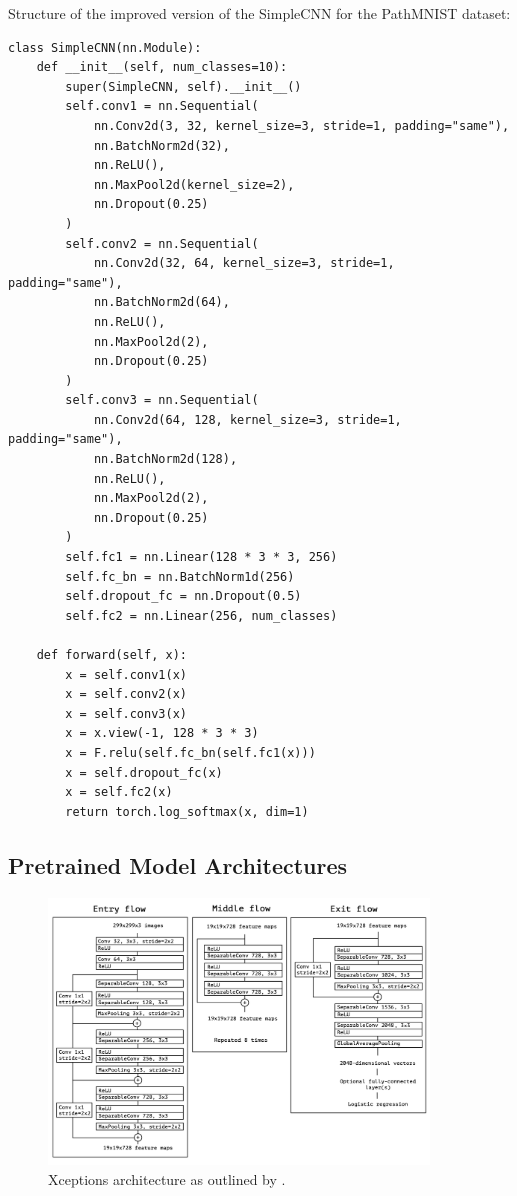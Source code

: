 Structure of the improved version of the SimpleCNN for the PathMNIST dataset:\@

\begin{verbatim}
class SimpleCNN(nn.Module):
    def __init__(self, num_classes=10):
        super(SimpleCNN, self).__init__()
        self.conv1 = nn.Sequential(
            nn.Conv2d(3, 32, kernel_size=3, stride=1, padding="same"),
            nn.BatchNorm2d(32),
            nn.ReLU(),
            nn.MaxPool2d(kernel_size=2),
            nn.Dropout(0.25)
        )
        self.conv2 = nn.Sequential(
            nn.Conv2d(32, 64, kernel_size=3, stride=1, padding="same"),
            nn.BatchNorm2d(64),
            nn.ReLU(),
            nn.MaxPool2d(2),
            nn.Dropout(0.25)
        )
        self.conv3 = nn.Sequential(
            nn.Conv2d(64, 128, kernel_size=3, stride=1, padding="same"),
            nn.BatchNorm2d(128),
            nn.ReLU(),
            nn.MaxPool2d(2),
            nn.Dropout(0.25)
        )
        self.fc1 = nn.Linear(128 * 3 * 3, 256)
        self.fc_bn = nn.BatchNorm1d(256)
        self.dropout_fc = nn.Dropout(0.5)
        self.fc2 = nn.Linear(256, num_classes)

    def forward(self, x):
        x = self.conv1(x)
        x = self.conv2(x)
        x = self.conv3(x)
        x = x.view(-1, 128 * 3 * 3)
        x = F.relu(self.fc_bn(self.fc1(x)))
        x = self.dropout_fc(x)
        x = self.fc2(x)
        return torch.log_softmax(x, dim=1)
\end{verbatim}

\subsection{Pretrained Model Architectures}\label{model_architectures}

\begin{figure}[ht]
    \centering
    \includegraphics[width=0.9\textwidth]{figures/xception_architecture.png}
    \caption{Xceptions architecture as outlined by \citeauthor{chollet2017xception}.}\label{fig:xceptionArchitecture}
\end{figure}


